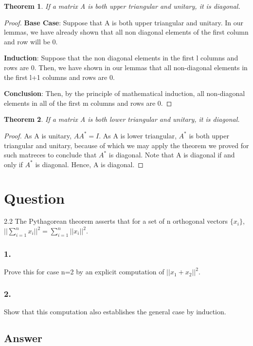 \documentclass[10pt]{amsart}
\newtheorem{thm}{Theorem}[subsection]
\theoremstyle{remark}
\begin{document}
\begin{thm}
If a matrix A is both upper triangular and unitary, it is diagonal.
\end{thm}
\begin{proof}
\textbf{Base Case}: Suppose that A is both upper triangular and unitary. In our lemmas, we have already shown that all non diagonal elements of the first column and row will be 0.

\textbf{Induction}: Suppose that the non diagonal elements in the first l columns and rows are 0. Then, we have shown in our lemmas that all non-diagonal elements in the first l+1 columns and rows are 0.

\textbf{Conclusion}: Then, by the principle of mathematical induction, all non-diagonal elements in all of the first m columns and rows are 0.
\end{proof}

\begin{thm}
If a matrix A is both lower triangular and unitary, it is diagonal.
\end{thm}
\begin{proof}
As A is unitary, $AA^{*} = I$. As A is lower triangular, $A^{*}$ is both upper triangular and unitary, because of which we may apply the theorem we proved for such matreces to conclude that $A^{*}$ is diagonal. Note that A is diagonal if and only if $A^{*}$ is diagonal. Hence, A is diagonal.
\end{proof}


\section{Question}
2.2 The Pythagorean theorem asserts that for a set of n orthogonal vectors $\{x_{i}\}$, $||\sum_{i=1}^{n} x_{i}||^{2} = \sum_{i=1}^{n}|| x_{i}||^{2}$.

\subsubsection{1.}
Prove this for case n=2 by an explicit computation of $||x_{1}+x_{2}||^{2}$.

\subsubsection{2.}
Show that this computation also establishes the general case by induction.

\subsection{Answer}
\end{document}
